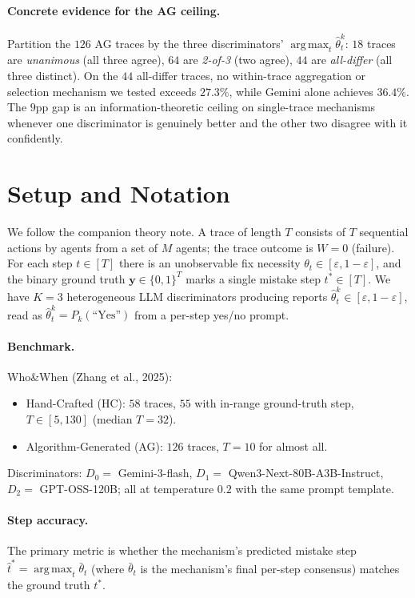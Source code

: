 \documentclass[11pt]{article}
\DeclareMathOperator*{\argmax}{arg\,max}
\newcommand{\thetahat}{\hat{\theta}}
\begin{document}
\paragraph{Concrete evidence for the AG ceiling.}
Partition the $126$ AG traces by the three discriminators'
$\argmax_t \thetahat^k_t$: $18$ traces are \emph{unanimous} (all three
agree), $64$ are \emph{2-of-3} (two agree), $44$ are \emph{all-differ}
(all three distinct). On the $44$ all-differ traces, no within-trace
aggregation or selection mechanism we tested exceeds $27.3\%$, while
Gemini alone achieves $36.4\%$. The $9$pp gap is an
information-theoretic ceiling on single-trace mechanisms whenever one
discriminator is genuinely better and the other two disagree with it
confidently.

\section{Setup and Notation}

We follow the companion theory note. A trace of length $T$ consists of $T$
sequential actions by agents from a set of $M$ agents; the trace outcome
is $W = 0$ (failure). For each step $t \in [T]$ there is an unobservable
fix necessity $\theta_t \in [\varepsilon, 1{-}\varepsilon]$, and the
binary ground truth $\bm y \in \{0, 1\}^T$ marks a single mistake step
$t^* \in [T]$. We have $K = 3$ heterogeneous LLM discriminators producing
reports $\thetahat^k_t \in [\varepsilon, 1{-}\varepsilon]$, read as
$\thetahat^k_t = P_k(\text{``Yes''})$ from a per-step yes/no prompt.

\paragraph{Benchmark.} Who\&When (Zhang et al., 2025):
\begin{itemize}[nosep]
\item Hand-Crafted (HC): $58$ traces, $55$ with in-range ground-truth
step, $T \in [5, 130]$ (median $T = 32$).
\item Algorithm-Generated (AG): $126$ traces, $T = 10$ for almost all.
\end{itemize}
Discriminators: $D_0 = $ Gemini-3-flash, $D_1 = $ Qwen3-Next-80B-A3B-Instruct,
$D_2 = $ GPT-OSS-120B; all at temperature $0.2$ with the same prompt
template.

\paragraph{Step accuracy.} The primary metric is whether the mechanism's
predicted mistake step $\hat t^* = \argmax_t \bar\theta_t$ (where
$\bar\theta_t$ is the mechanism's final per-step consensus) matches the
ground truth $t^*$.
\end{document}
